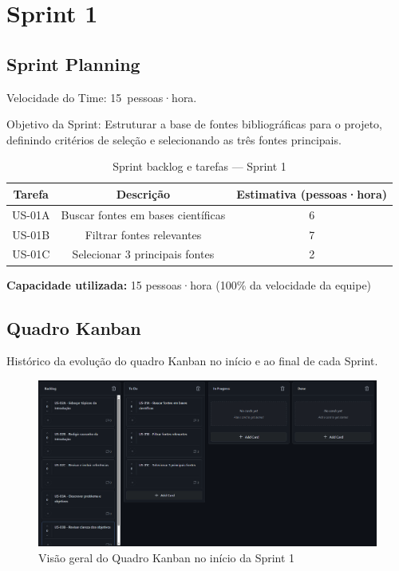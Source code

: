 \section{Sprint 1}

\subsection{Sprint Planning}

Velocidade do Time: 15~pessoas·hora.

Objetivo da Sprint: Estruturar a base de fontes bibliográficas para o projeto, definindo critérios de seleção e selecionando as três fontes principais.

\begin{table}[htbp]
  \centering
  \caption{Sprint backlog e tarefas — Sprint 1}
  \label{tab:sprint1}
  \begin{tabular}{ccc}
    \toprule
    Tarefa & Descrição & Estimativa (pessoas·hora) \\
    \midrule
    US-01A & Buscar fontes em bases científicas & 6 \\
    US-01B & Filtrar fontes relevantes & 7 \\
    US-01C & Selecionar 3 principais fontes & 2 \\
    \bottomrule
  \end{tabular}
\end{table}

\vspace{0.5em}
\noindent\textbf{Capacidade utilizada:} 15 pessoas·hora (100\% da velocidade da equipe)

\subsection{Quadro Kanban}

Histórico da evolução do quadro Kanban no início e ao final de cada Sprint.

\begin{figure}[htbp]
  \centering
  \includegraphics[width=0.8\linewidth]{pictures/kanban_sprint1_inicio.png}
  \caption{Visão geral do Quadro Kanban no início da Sprint 1}
\end{figure}


